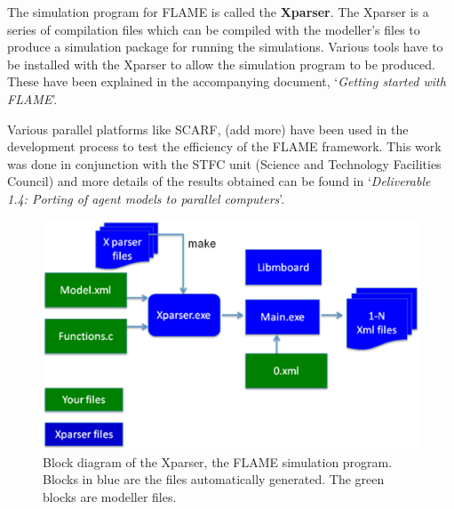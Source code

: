\documentclass[a4paper,12pt]{article}
\begin{document}
The simulation program for FLAME is called the \textbf{Xparser}. The
Xparser is a series of compilation files which can be compiled with
the modeller's files to produce a simulation package for running
the simulations. Various tools have to be installed with the Xparser
to allow the simulation program to be produced. These have been
explained in the accompanying document, `\emph{Getting started with
FLAME}'.

Various parallel platforms like SCARF, (add more) have been used in
the development process to test the efficiency of the FLAME
framework. This work was done in conjunction with the STFC unit (Science and Technology Facilities Council) and more
details of the results obtained can be found in `\emph{Deliverable
1.4: Porting of agent models to parallel computers}'.



\begin{figure}[!htb]
\begin{center}
  \includegraphics*[scale=0.35]{xparserdiag.eps}
  \caption{Block diagram of the Xparser, the FLAME simulation program. Blocks in blue are the files automatically generated. The green blocks are modeller files.}
  \label{fig:xparserdiag}
  \end{center}
\end{figure}






%
%
\end{document}
